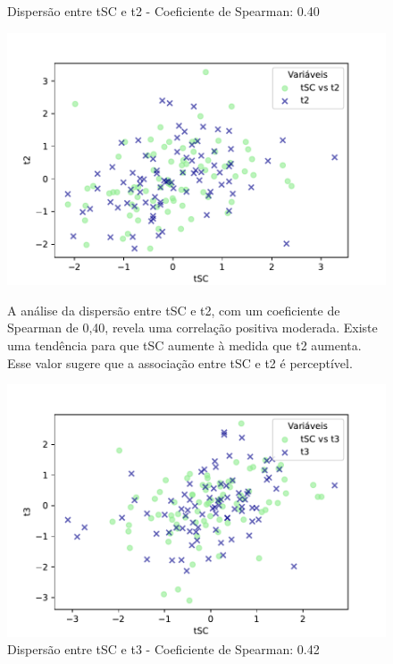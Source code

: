 \begin{figure}[h]
    \captionsetup{font=footnotesize, justification=centering, labelsep=period, position=above}
    \centering
    \begin{minipage}[b]{0.45\linewidth}
        \caption{Dispersão entre tSC e t2 - Coeficiente de Spearman: 0.40}
        \label{fig:tSC-t2}
        \centering
        \includegraphics[scale=0.35]{figuras/Spearman/tSC-t2.pdf}
        \vspace{0.3cm}
        \caption{A análise da dispersão entre tSC e t2, com um coeficiente de Spearman de 0,40, revela uma correlação positiva moderada. Existe  uma tendência para que tSC aumente à medida que t2 aumenta. Esse valor sugere que a associação entre tSC e t2 é perceptível.}
        \begin{minipage}{\linewidth}
            \centering
        \end{minipage}
    \end{minipage}
    \hspace{0.05\linewidth}
    \begin{minipage}[b]{0.45\linewidth}
        \caption{Dispersão entre tSC e t3 - Coeficiente de Spearman: 0.42}
        \label{fig:tSC-t3}
        \centering
        \includegraphics[scale=0.35]{figuras/Spearman/tSC-t3.pdf}

\end{minipage}
\end{figure}
